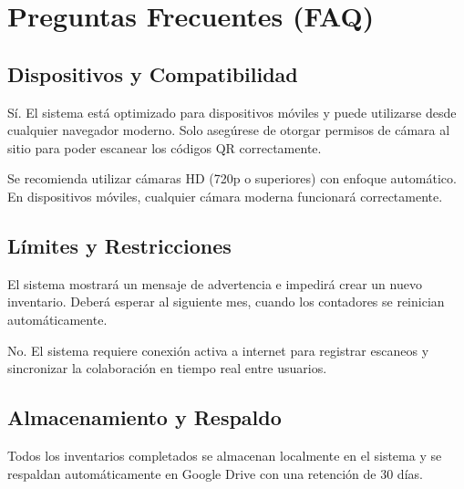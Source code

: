 \documentclass[11pt,a4paper]{article}
\begin{document}
\section{Preguntas Frecuentes (FAQ)}

\subsection{Dispositivos y Compatibilidad}

\begin{infobox}
Sí. El sistema está optimizado para dispositivos móviles y puede utilizarse desde cualquier navegador moderno. Solo asegúrese de otorgar permisos de cámara al sitio para poder escanear los códigos QR correctamente.
\end{infobox}

\begin{infobox}
Se recomienda utilizar cámaras HD (720p o superiores) con enfoque automático. En dispositivos móviles, cualquier cámara moderna funcionará correctamente.
\end{infobox}

\subsection{Límites y Restricciones}

\begin{warningbox}
El sistema mostrará un mensaje de advertencia e impedirá crear un nuevo inventario. Deberá esperar al siguiente mes, cuando los contadores se reinician automáticamente.
\end{warningbox}

\begin{infobox}
No. El sistema requiere conexión activa a internet para registrar escaneos y sincronizar la colaboración en tiempo real entre usuarios.
\end{infobox}

\subsection{Almacenamiento y Respaldo}

\begin{successbox}
Todos los inventarios completados se almacenan localmente en el sistema y se respaldan automáticamente en Google Drive con una retención de 30 días.
\end{successbox}
\end{document}
